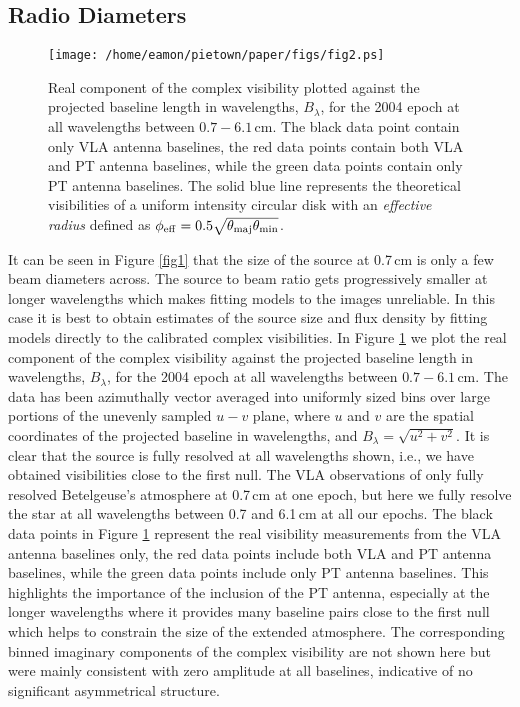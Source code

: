 \documentclass[iop]{emulateapj}
\begin{document}
\subsection{Radio Diameters} 
\begin{figure}
\texttt{[image: /home/eamon/pietown/paper/figs/fig2.ps]}
\caption{Real component of the complex visibility plotted against the projected baseline length in wavelengths, $B_{\lambda}$, for the 2004 epoch at all wavelengths between $0.7-6.1$\,cm. The black data point contain only VLA antenna baselines, the red data points contain both VLA and PT antenna baselines, while the green data points contain only PT antenna baselines. The solid blue line represents the theoretical visibilities of a uniform intensity circular disk with an \textit{effective radius} defined as $\phi _{\rm{eff}}=0.5\sqrt{\theta _{\rm{maj}}\theta _{\rm{min}}}$.}
\label{fig2}
\end{figure}
It can be seen in Figure \ref{fig1} that the size of the source at 0.7\,cm is only a few beam diameters across. The source to beam ratio gets progressively smaller at longer wavelengths which makes fitting models to the images unreliable. In this case it is best to obtain estimates of the source size and flux density by fitting models directly to the calibrated complex visibilities. In Figure \ref{fig2} we plot the real component of the complex visibility against the projected baseline length in wavelengths, $B_{\lambda}$, for the 2004 epoch at all wavelengths between $0.7-6.1$\,cm. The data has been azimuthally vector averaged into uniformly sized bins over large portions of the unevenly sampled $u-v$ plane, where $u$ and $v$ are the spatial coordinates of the projected baseline in wavelengths, and $B_{\lambda} = \sqrt{u^2 + v^2}$. It is clear that the source is fully resolved at all wavelengths shown, i.e., we have obtained visibilities close to the first null. The VLA observations of \cite{lim_1998} only fully resolved Betelgeuse's atmosphere at 0.7\,cm at one epoch, but here we fully resolve the star at all wavelengths between 0.7 and 6.1\,cm at all our epochs. The black data points in Figure \ref{fig2} represent the real visibility measurements from the VLA antenna baselines only, the red data points include both VLA and PT antenna baselines, while the green data points include only PT antenna baselines. This highlights the importance of the inclusion of the PT antenna, especially at the longer wavelengths where it provides many baseline pairs close to the first null which helps to constrain the size of the extended atmosphere. The corresponding binned imaginary components of the complex visibility are not shown here but were mainly consistent with zero amplitude at all baselines, indicative of no significant asymmetrical structure. 
\end{document}
